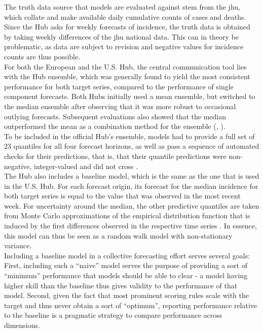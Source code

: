 The truth data source that models are evaluated against stem from the \ac{jhu}, which collate and make available daily cumulative counts of cases and deaths. Since the Hub asks for weekly forecasts of incidence, the truth data is obtained by taking weekly differences of the \ac{jhu} national data. This can in theory be problematic, as data are subject to revision and negative values for incidence counts are thus possible.\\
For both the European and the U.S. Hub, the central communication tool lies with the Hub ensemble, which was generally found to yield the most consistent performance for both target series, compared to the performance of single component forecasts. Both Hubs initially used a mean ensemble, but switched to the median ensemble after observing that it was more robust to occasional outlying forecasts. Subsequent evaluations also showed that the median outperformed the mean as a combination method for the ensemble (\cite{sherratt_european_2022}, \cite{ray_comparing_2022}). \\
To be included in the official Hub's ensemble, models had to provide a full set of 23 quantiles for all four forecast horizons, as well as pass a sequence of automated checks for their predictions, that is, that their quantile predictions were non-negative, integer-valued and did not cross \citep{sherratt_european_2022}.\\
The Hub also includes a baseline model, which is the same as the one that is used in the U.S. Hub. For each forecast origin, its forecast for the median incidence for both target series is equal to the value that was observed in the most recent week. For uncertainty around the median, the other predictive quantiles are taken from Monte Carlo approximations of the empirical distribution function that is induced by the first differences observed in the respective time series \citep{cramer_evaluation_2022}. In essence, this model can thus be seen as a random walk model with non-stationary variance.\\
Including a baseline model in a collective forecasting effort serves several goals: First, including such a ``naive'' model serves the purpose of providing a sort of ``minimum'' performance that models should be able to clear - a model having higher skill than the baseline thus gives validity to the performance of that model. Second, given the fact that most prominent scoring rules scale with the target and thus never obtain a sort of ``optimum'', reporting performance relative to the baseline is a pragmatic strategy to compare performance across dimensions.%
